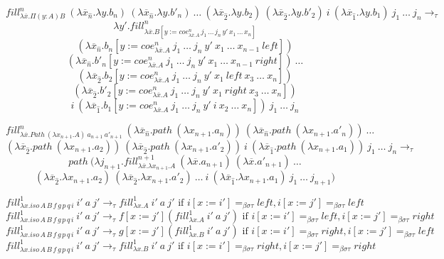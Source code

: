 \documentclass{amsart}
\theoremstyle{definition}
\theoremstyle{remark}
\newcommand{\bs}{\beta\sigma}
\newcommand{\bst}{\bs\tau}
\newcommand{\ebst}{=_{\bst}}
\numberwithin{figure}{section}
\begin{document}
\[ fill^n_{\lambda \overline{x}. \Pi (y : A) B}\ (\lambda \overline{x}_{\hat{n}}. \lambda y. b_n)\ (\lambda \overline{x}_{\hat{n}}. \lambda y. b'_n)\ \ldots\ (\lambda \overline{x}_{\hat{2}}. \lambda y. b_2)\ (\lambda \overline{x}_{\hat{2}}. \lambda y. b'_2)\ i\ (\lambda \overline{x}_{\hat{1}}. \lambda y. b_1)\ j_1\ \ldots\ j_n \to_\tau \]
\[ \lambda y'. fill^n_{\lambda \overline{x}. B[y := coe^n_{\lambda \overline{x}. A}\,j_1\,\ldots\,j_n\,y'\,x_1\,\ldots\,x_n]} \]
\[ (\lambda \overline{x}_{\hat{n}}. b_n[y := coe^n_{\lambda \overline{x}. A}\ j_1\ \ldots\ j_n\ y'\ x_1\ \ldots\ x_{n-1}\ left]) \]
\[ (\lambda \overline{x}_{\hat{n}}. b'_n[y := coe^n_{\lambda \overline{x}. A}\ j_1\ \ldots\ j_n\ y'\ x_1\ \ldots\ x_{n-1}\ right])\ \ldots \]
\[ (\lambda \overline{x}_{\hat{2}}. b_2[y := coe^n_{\lambda \overline{x}. A}\ j_1\ \ldots\ j_n\ y'\ x_1\ left\ x_3\ \ldots\ x_n]) \]
\[ (\lambda \overline{x}_{\hat{2}}. b'_2[y := coe^n_{\lambda \overline{x}. A}\ j_1\ \ldots\ j_n\ y'\ x_1\ right\ x_3\ \ldots\ x_n]) \]
\[ i\ (\lambda \overline{x}_{\hat{1}}. b_1[y := coe^n_{\lambda \overline{x}. A}\ j_1\ \ldots\ j_n\ y'\ i\ x_2\ \ldots\ x_n])\ j_1\ \ldots\ j_n \]

\[ fill^n_{\lambda \overline{x}. Path\ (\lambda x_{n+1}. A)\ a_{n+1}\ a'_{n+1}}\ (\lambda \overline{x}_{\hat{n}}. path\ (\lambda x_{n+1}. a_n))\ (\lambda \overline{x}_{\hat{n}}. path\ (\lambda x_{n+1}. a'_n))\ \ldots \]
\[ (\lambda \overline{x}_{\hat{2}}. path\ (\lambda x_{n+1}. a_2))\ (\lambda \overline{x}_{\hat{2}}. path\ (\lambda x_{n+1}. a'_2))\ i\ (\lambda \overline{x}_{\hat{1}}. path\ (\lambda x_{n+1}. a_1))\ j_1\ \ldots\ j_n \to_\tau \]
\[ path\ (\lambda j_{n+1}. fill^{n+1}_{\lambda \overline{x}. \lambda x_{n+1}. A}\ (\lambda \overline{x}. a_{n+1})\ (\lambda \overline{x}. a'_{n+1})\ \ldots \]
\[ (\lambda \overline{x}_{\hat{2}}. \lambda x_{n+1}. a_2)\ (\lambda \overline{x}_{\hat{2}}. \lambda x_{n+1}. a'_2)\ \ldots\ i\ (\lambda \overline{x}_{\hat{1}}. \lambda x_{n+1}. a_1)\ j_1\ \ldots\ j_{n+1}) \]

\[ fill^1_{\lambda x. iso\,A\,B\,f\,g\,p\,q\,i}\ i'\ a\ j' \to_\tau fill^1_{\lambda x. A}\ i'\ a\ j' \text{ if } i[x := i'] \ebst left, i[x := j'] \ebst left \]
\[ fill^1_{\lambda x. iso\,A\,B\,f\,g\,p\,q\,i}\ i'\ a\ j' \to_\tau f[x := j'] (fill^1_{\lambda x. A}\ i'\ a\ j') \text{ if } i[x := i'] \ebst left, i[x := j'] \ebst right \]
\[ fill^1_{\lambda x. iso\,A\,B\,f\,g\,p\,q\,i}\ i'\ a\ j' \to_\tau g[x := j'] (fill^1_{\lambda x. B}\ i'\ a\ j') \text{ if } i[x := i'] \ebst right, i[x := j'] \ebst left \]
\[ fill^1_{\lambda x. iso\,A\,B\,f\,g\,p\,q\,i}\ i'\ a\ j' \to_\tau fill^1_{\lambda x. B}\ i'\ a\ j' \text{ if } i[x := i'] \ebst right, i[x := j'] \ebst right \]
\end{document}
